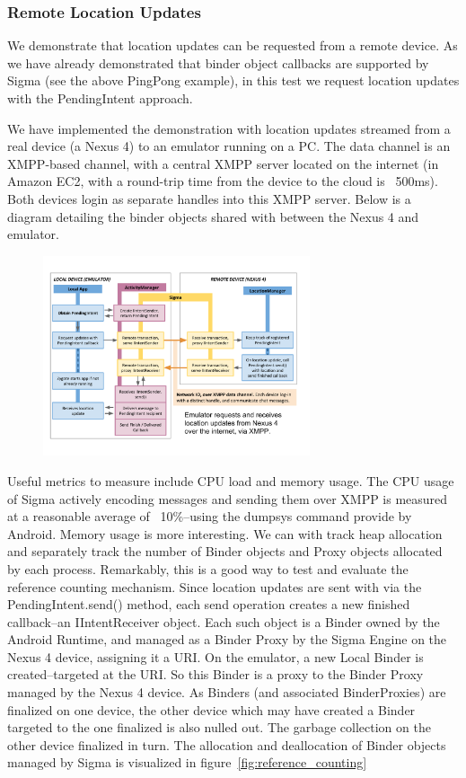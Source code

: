 \documentclass[prodmode]{acmlarge}
\begin{document}
\subsubsection{Remote Location Updates}
We demonstrate that location updates can be requested from a remote device. As we have already demonstrated that binder object callbacks are supported by Sigma (see the above PingPong example), in this test we request location updates with the PendingIntent approach.

We have implemented the demonstration with location updates streamed from a real device (a Nexus 4) to an emulator running on a PC. The data channel is an XMPP-based channel, with a central XMPP server located on the internet (in Amazon EC2, with a round-trip time from the device to the cloud is ~500ms). Both devices login as separate handles into this XMPP server.
Below is a diagram detailing the binder objects shared with between the Nexus 4 and emulator.

\begin{figure}[h]
\centering
\includegraphics[width=0.7\textwidth]{drawings/LocationPendingIntentExample.pdf}
\end{figure}

Useful metrics to measure include CPU load and memory usage. The CPU usage of Sigma actively encoding messages and sending them over XMPP is measured at a reasonable average of ~10\%--using the dumpsys command provide by Android. Memory usage is more interesting. We can with track heap allocation and separately track the number of Binder objects and Proxy objects allocated by each process. Remarkably, this is a good way to test and evaluate the reference counting mechanism. Since location updates are sent with via the PendingIntent.send() method, each send operation creates a new finished callback--an IIntentReceiver object. Each such object is a Binder owned by the Android Runtime, and managed as a Binder Proxy by the Sigma Engine on the Nexus 4 device, assigning it a URI. On the emulator, a new Local Binder is created--targeted at the URI. So this Binder is a proxy to the Binder Proxy managed by the Nexus 4 device. As Binders (and associated BinderProxies) are finalized on one device, the other device which may have created a Binder targeted to the one finalized is also nulled out. The garbage collection on the other device finalized in turn. The allocation and deallocation of Binder objects managed by Sigma is visualized in figure~\ref{fig:reference_counting} 
\end{document}
